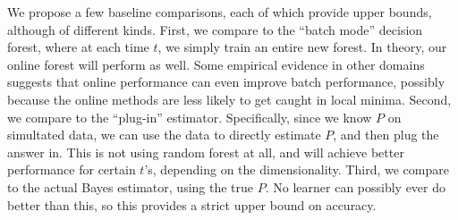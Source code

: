 \documentclass{article}
\begin{document}
We propose a few baseline comparisons, each of which provide upper bounds, although of different kinds.  First, we compare to the ``batch mode'' decision forest, where at each time $t$, we simply train an entire new forest.  In theory, our online forest will perform as well.  Some empirical evidence in other domains suggests that online performance can even improve batch performance, possibly because the online methods are less likely to get caught in local minima.  Second, we compare to the ``plug-in'' estimator.  Specifically, since we know $P$ on simultated data, we can use the data to directly estimate $P$, and then plug the answer in.  This is not using random forest at all, and will achieve better performance for certain $t$'s, depending on the dimensionality.  Third, we compare to the actual Bayes estimator, using the true $P$.  No learner can possibly ever do better than this, so this provides a strict upper bound on accuracy. 
\end{document}

